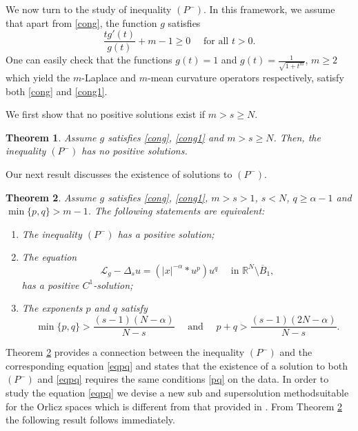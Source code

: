 \documentclass[10pt,a4paper]{amsart}
\numberwithin{equation}{section}
\newcommand{\R}{\mathbb R}
\newcommand{\Lg}{{\mathcal L}_g}
\newtheorem{theorem}{Theorem}[section]
\begin{document}
We now turn to the study of inequality $(P^-)$. In this framework, we assume that apart from \eqref{cong}, the function $g$ satisfies 
\begin{equation}\label{cong1}
\frac{tg'(t)}{g(t)}+m-1\geq 0 \quad\mbox{ for all }t>0.
\end{equation}
One can easily check that the functions $g(t)=1$ and $g(t)=\frac{1}{\sqrt{1+t^m}}$, $m\geq 2$ which yield the $m$-Laplace and $m$-mean curvature operators respectively, satisfy both \eqref{cong} and \eqref{cong1}.

We first show that no positive solutions exist if $m>s\geq N$. 
\begin{theorem}\label{tm1}
Assume $g$ satisfies \eqref{cong}, \eqref{cong1} and $m>s\geq N$. Then, the inequality $(P^-)$ has no positive solutions. 
\end{theorem}

Our next result discusses the existence of solutions to $(P^-)$. 

\begin{theorem}\label{tm2}
Assume $g$ satisfies \eqref{cong}, \eqref{cong1}, $m>s>1$, $s<N$, $q\geq \alpha-1$ and $\min\{p,q\}>m-1$. 
The following statements are equivalent:
\begin{enumerate}
\item[(i)] The inequality $(P^-)$ has a positive solution;
\item[(ii)] The equation 
\begin{equation}\label{eqpq}
\Lg-\Delta_s u=(|x|^{-\alpha}*u^p)u^q
\quad\mbox{ in }\R^N\setminus \overline B_1,
\end{equation}  
has a positive $C^1$-solution;
\item[(iii)] The exponents $p$ and $q$ satisfy
\begin{equation}\label{pq}
\min\{p, q\}>\frac{(s-1)(N-\alpha)}{N-s} \quad\mbox{ and }\quad p+q>\frac{(s-1)(2N-\alpha)}{N-s}.
\end{equation}
\end{enumerate}
\end{theorem}

Theorem \ref{tm2} provides a connection between the inequality $(P^-)$ and the corresponding equation \eqref{eqpq} and states that the existence of a solution to both $(P^-)$ and \eqref{eqpq} requires the same conditions \eqref{pq} on the data. In order to study the equation \eqref{eqpq} we devise a new sub and supersolution methodsuitable for the Orlicz spaces which is different from that provided in \cite{F18}. From Theorem \ref{tm2} the following result follows immediately.
\end{document}
